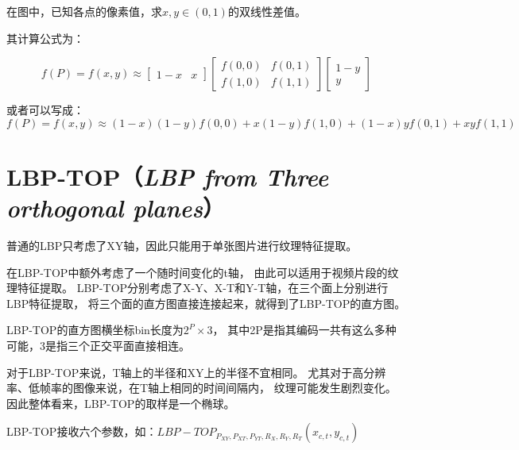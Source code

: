 \documentclass[AutoFakeBold]{MyFormat}
\begin{document}
\par 在图中，已知各点的像素值，求$x, y\in (0, 1)$的双线性差值。
\par 其计算公式为：

\begin{equation}
    f(P)=f(x, y)\approx 
    \begin{bmatrix}
        1-x & x
    \end{bmatrix}
    \begin{bmatrix}
        f(0, 0) & f(0, 1)\\
        f(1, 0) & f(1, 1)
    \end{bmatrix}
    \begin{bmatrix} 
        1-y\\y
    \end{bmatrix}
\end{equation}

\par 或者可以写成：
\begin{equation}
    f(P)=f(x, y) \approx (1-x)(1-y)f(0, 0)+x(1-y)f(1, 0)+(1-x)yf(0, 1)+
    xyf(1, 1)
\end{equation}

\section{LBP-TOP（\textit{LBP from Three orthogonal planes}）}
\par 普通的LBP只考虑了XY轴，因此只能用于单张图片进行纹理特征提取。
\par 在LBP-TOP中额外考虑了一个随时间变化的t轴，
由此可以适用于视频片段的纹理特征提取。
LBP-TOP分别考虑了X-Y、X-T和Y-T轴，在三个面上分别进行LBP特征提取，
将三个面的直方图直接连接起来，就得到了LBP-TOP的直方图。
\par LBP-TOP的直方图横坐标bin长度为$2^P\times 3$，
其中2P是指其编码一共有这么多种可能，3是指三个正交平面直接相连。
\\\hspace*{\fill}
\par 对于LBP-TOP来说，T轴上的半径和XY上的半径不宜相同。
尤其对于高分辨率、低帧率的图像来说，在T轴上相同的时间间隔内，
纹理可能发生剧烈变化。因此整体看来，LBP-TOP的取样是一个椭球。\\
\hspace*{\fill}

\par LBP-TOP接收六个参数，如：$LBP-TOP_{P_{XY}, P_{XT},
P_{YT}, R_X, R_Y, R_T}(x_{c, t}, y_{c, t})$
\\\hspace*{\fill}
\end{document}
